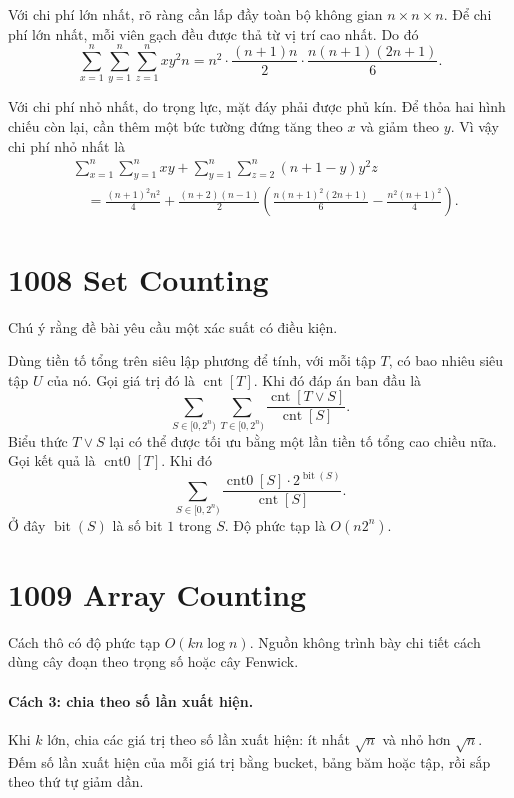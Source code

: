 \documentclass[11pt]{article}
\begin{document}
Với chi phí lớn nhất, rõ ràng cần lấp đầy toàn bộ không gian
$n\times n\times n$. Để chi phí lớn nhất, mỗi viên gạch đều được thả từ vị
trí cao nhất. Do đó
\[
  \sum_{x=1}^{n}\sum_{y=1}^{n}\sum_{z=1}^{n} x y^2 n
  =
  n^2\cdot\frac{(n+1)n}{2}\cdot\frac{n(n+1)(2n+1)}{6}.
\]

Với chi phí nhỏ nhất, do trọng lực, mặt đáy phải được phủ kín. Để thỏa hai
hình chiếu còn lại, cần thêm một bức tường đứng tăng theo $x$ và giảm theo
$y$. Vì vậy chi phí nhỏ nhất là
\[
\begin{aligned}
  &\sum_{x=1}^{n}\sum_{y=1}^{n}xy
  +\sum_{y=1}^{n}\sum_{z=2}^{n}(n+1-y)y^2z\\
  &\quad =
  \frac{(n+1)^2n^2}{4}
  +\frac{(n+2)(n-1)}{2}
  \left(
    \frac{n(n+1)^2(2n+1)}{6}
    -\frac{n^2(n+1)^2}{4}
  \right).
\end{aligned}
\]

\section{1008 Set Counting}

Chú ý rằng đề bài yêu cầu một xác suất có điều kiện.

Dùng tiền tố tổng trên siêu lập phương để tính, với mỗi tập $T$, có bao nhiêu
siêu tập $U$ của nó. Gọi giá trị đó là $\operatorname{cnt}[T]$. Khi đó đáp
án ban đầu là
\[
  \sum_{S\in[0,2^n)}\sum_{T\in[0,2^n)}
  \frac{\operatorname{cnt}[T\vee S]}{\operatorname{cnt}[S]}.
\]
Biểu thức $T\vee S$ lại có thể được tối ưu bằng một lần tiền tố tổng cao
chiều nữa. Gọi kết quả là $\operatorname{cnt0}[T]$. Khi đó
\[
  \sum_{S\in[0,2^n)}
  \frac{\operatorname{cnt0}[S]\cdot 2^{\operatorname{bit}(S)}}
       {\operatorname{cnt}[S]}.
\]
Ở đây $\operatorname{bit}(S)$ là số bit $1$ trong $S$. Độ phức tạp là
$O(n2^n)$.

\section{1009 Array Counting}

Cách thô có độ phức tạp $O(kn\log n)$. Nguồn không trình bày chi tiết cách
dùng cây đoạn theo trọng số hoặc cây Fenwick.

\paragraph{Cách 3: chia theo số lần xuất hiện.}
Khi $k$ lớn, chia các giá trị theo số lần xuất hiện: ít nhất $\sqrt n$ và
nhỏ hơn $\sqrt n$. Đếm số lần xuất hiện của mỗi giá trị bằng bucket, bảng
băm hoặc tập, rồi sắp theo thứ tự giảm dần.
\end{document}

